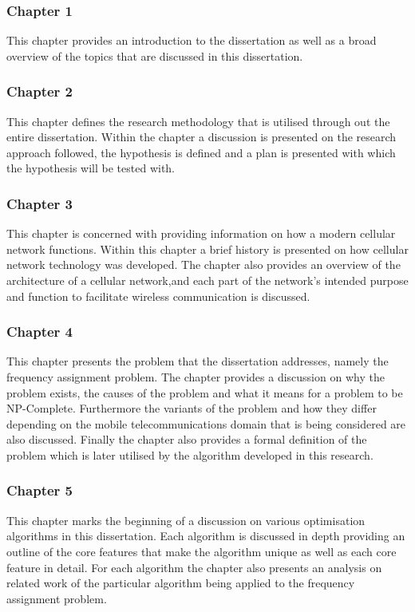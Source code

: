 \subsubsection{Chapter 1}
This chapter provides an introduction to the dissertation as well as a broad overview of the topics that are discussed in this dissertation.
\subsubsection{Chapter 2}
This chapter defines the research methodology that is utilised through out the entire dissertation. Within the chapter a discussion is presented on the research approach followed, the hypothesis is defined and a plan is presented with which the hypothesis will be tested with.
\subsubsection{Chapter 3}
This chapter is concerned with providing information on how a modern cellular network functions. Within this chapter a brief history is presented on how cellular network technology was developed. The chapter also provides an overview of the architecture of a cellular network,and each part of the network's intended purpose and function to facilitate wireless communication is discussed.
\subsubsection{Chapter 4}
This chapter presents the problem that the dissertation addresses, namely the frequency assignment problem. The chapter provides a discussion on why the problem exists, the causes of the problem and what it means for a problem to be NP-Complete. Furthermore the variants of the problem and how they differ depending on the mobile telecommunications domain that is being considered are also discussed. Finally the chapter also provides a formal definition of the problem which is later utilised by the algorithm developed in this research.
\subsubsection{Chapter 5}
This chapter marks the beginning of a discussion on various optimisation algorithms in this dissertation. Each algorithm is discussed in depth providing an outline of the core features that make the algorithm unique as well as each core feature in detail. For each algorithm the chapter also presents an analysis on related work of the particular algorithm being applied to the frequency assignment problem. 

